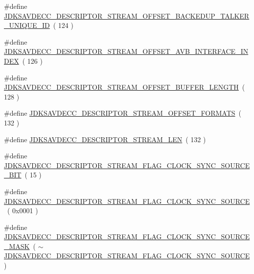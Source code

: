 \begin{DoxyCompactItemize}
\item 
\#define \hyperlink{group__descriptor__stream_gaa7deba914eff10be3e3cad58dff47cd0}{J\+D\+K\+S\+A\+V\+D\+E\+C\+C\+\_\+\+D\+E\+S\+C\+R\+I\+P\+T\+O\+R\+\_\+\+S\+T\+R\+E\+A\+M\+\_\+\+O\+F\+F\+S\+E\+T\+\_\+\+B\+A\+C\+K\+E\+D\+U\+P\+\_\+\+T\+A\+L\+K\+E\+R\+\_\+\+U\+N\+I\+Q\+U\+E\+\_\+\+ID}~( 124 )
\item 
\#define \hyperlink{group__descriptor__stream_ga63cbd5e74dc3dd343d7d318527d6d2e1}{J\+D\+K\+S\+A\+V\+D\+E\+C\+C\+\_\+\+D\+E\+S\+C\+R\+I\+P\+T\+O\+R\+\_\+\+S\+T\+R\+E\+A\+M\+\_\+\+O\+F\+F\+S\+E\+T\+\_\+\+A\+V\+B\+\_\+\+I\+N\+T\+E\+R\+F\+A\+C\+E\+\_\+\+I\+N\+D\+EX}~( 126 )
\item 
\#define \hyperlink{group__descriptor__stream_gab03b3cdad9d522183135f71b78aa3b56}{J\+D\+K\+S\+A\+V\+D\+E\+C\+C\+\_\+\+D\+E\+S\+C\+R\+I\+P\+T\+O\+R\+\_\+\+S\+T\+R\+E\+A\+M\+\_\+\+O\+F\+F\+S\+E\+T\+\_\+\+B\+U\+F\+F\+E\+R\+\_\+\+L\+E\+N\+G\+TH}~( 128 )
\item 
\#define \hyperlink{group__descriptor__stream_gab262f62f50e8514c49707ca05cc2fcd3}{J\+D\+K\+S\+A\+V\+D\+E\+C\+C\+\_\+\+D\+E\+S\+C\+R\+I\+P\+T\+O\+R\+\_\+\+S\+T\+R\+E\+A\+M\+\_\+\+O\+F\+F\+S\+E\+T\+\_\+\+F\+O\+R\+M\+A\+TS}~( 132 )
\item 
\#define \hyperlink{group__descriptor__stream_gacaa7489d625d3c733ab8813b5fb7dbe5}{J\+D\+K\+S\+A\+V\+D\+E\+C\+C\+\_\+\+D\+E\+S\+C\+R\+I\+P\+T\+O\+R\+\_\+\+S\+T\+R\+E\+A\+M\+\_\+\+L\+EN}~( 132 )
\item 
\#define \hyperlink{group__descriptor__stream_gad3561610a8354baa4d0bcaf2c67f8847}{J\+D\+K\+S\+A\+V\+D\+E\+C\+C\+\_\+\+D\+E\+S\+C\+R\+I\+P\+T\+O\+R\+\_\+\+S\+T\+R\+E\+A\+M\+\_\+\+F\+L\+A\+G\+\_\+\+C\+L\+O\+C\+K\+\_\+\+S\+Y\+N\+C\+\_\+\+S\+O\+U\+R\+C\+E\+\_\+\+B\+IT}~( 15 )
\item 
\#define \hyperlink{group__descriptor__stream_ga8a0cb44a8c45aea819089995f6874ff3}{J\+D\+K\+S\+A\+V\+D\+E\+C\+C\+\_\+\+D\+E\+S\+C\+R\+I\+P\+T\+O\+R\+\_\+\+S\+T\+R\+E\+A\+M\+\_\+\+F\+L\+A\+G\+\_\+\+C\+L\+O\+C\+K\+\_\+\+S\+Y\+N\+C\+\_\+\+S\+O\+U\+R\+CE}~( 0x0001 )
\item 
\#define \hyperlink{group__descriptor__stream_ga58194340d05b5d547275cd529db65663}{J\+D\+K\+S\+A\+V\+D\+E\+C\+C\+\_\+\+D\+E\+S\+C\+R\+I\+P\+T\+O\+R\+\_\+\+S\+T\+R\+E\+A\+M\+\_\+\+F\+L\+A\+G\+\_\+\+C\+L\+O\+C\+K\+\_\+\+S\+Y\+N\+C\+\_\+\+S\+O\+U\+R\+C\+E\+\_\+\+M\+A\+SK}~( $\sim$\hyperlink{group__descriptor__stream_ga8a0cb44a8c45aea819089995f6874ff3}{J\+D\+K\+S\+A\+V\+D\+E\+C\+C\+\_\+\+D\+E\+S\+C\+R\+I\+P\+T\+O\+R\+\_\+\+S\+T\+R\+E\+A\+M\+\_\+\+F\+L\+A\+G\+\_\+\+C\+L\+O\+C\+K\+\_\+\+S\+Y\+N\+C\+\_\+\+S\+O\+U\+R\+CE} )

\end{DoxyCompactItemize}
